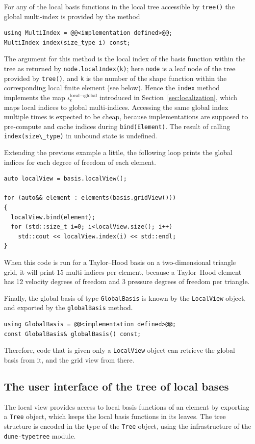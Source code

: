 \documentclass[a4paper,10pt,headings=normal,bibliography=totoc]{scrartcl}
\newcommand{\cpp}[1]{\lstinline[basicstyle=\ttfamily]!#1!}
\newcommand{\dunemodule}[1]{\texttt{#1}}
\begin{document}
For any of the local basis functions in the local tree
accessible by \cpp{tree()} the global multi-index
is provided by the method
\begin{lstlisting}[style=Interface]
using MultiIndex = @@<implementation defined>@@;
MultiIndex index(size_type i) const;
\end{lstlisting}
The argument for this method is the local
index of the basis function within the tree as
returned by \cpp{node.localIndex(k)};
here \cpp{node} is a leaf node of the
tree provided by \cpp{tree()}, and \cpp{k}
is the number of the shape function within the corresponding
local finite element (see below).
Hence the \cpp{index} method
implements the map $\iota^{\text{local}\to\text{global}}_e$
introduced in Section~\ref{sec:localization},
which maps local indices to global multi-indices.
Accessing the same global index multiple times
is expected to be cheap, because implementations are supposed to pre-compute
and cache indices during \cpp{bind(Element)}.
The result of calling \cpp{index(size\_type)} in
unbound state is undefined.

Extending the previous example a little, the following loop prints the
global indices for each degree of freedom of each element.
\begin{lstlisting}[style=example]
auto localView = basis.localView();

for (auto&& element : elements(basis.gridView()))
{
  localView.bind(element);
  for (std::size_t i=0; i<localView.size(); i++)
    std::cout << localView.index(i) << std::endl;
}
\end{lstlisting}
When this code is run for a Taylor--Hood basis on a two-dimensional triangle grid,
it will print 15 multi-indices per element, because a Taylor--Hood element has 12
velocity degrees of freedom and 3 pressure degrees of freedom per triangle.

Finally, the global basis of type \cpp{GlobalBasis}
is known by the \cpp{LocalView} object, and exported by the \cpp{globalBasis} method.
\begin{lstlisting}[style=Interface]
using GlobalBasis = @@<implementation defined>@@;
const GlobalBasis& globalBasis() const;
\end{lstlisting}
%
Therefore, code that is given only a \cpp{LocalView} object can retrieve the
global basis from it, and the grid view from there.


\subsection{The user interface of the tree of local bases}
The local view provides access to local basis functions of an element
by exporting a \cpp{Tree} object, which keeps the local basis functions in its leaves.
The tree structure is encoded in the type of the \cpp{Tree} object,
using the infrastructure of the \dunemodule{dune-typetree} module.
\end{document}
